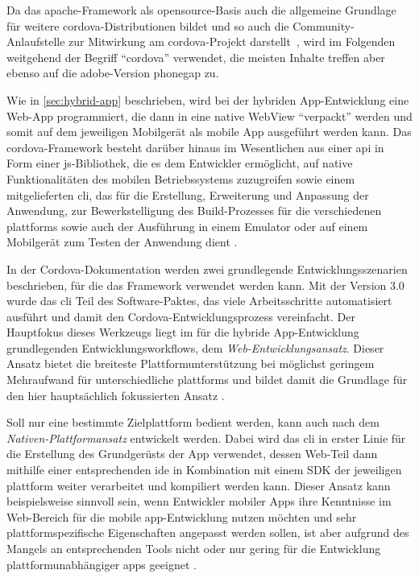 Da das \gls{apache}-Framework als \gls{opensource}-Basis auch die allgemeine Grundlage für weitere \gls{cordova}-Distributionen bildet und so auch die Community-Anlaufstelle zur Mitwirkung am \gls{cordova}-Projekt darstellt~\cite{PhoneGap_Cordova_and_whats_in_a_name}, wird im Folgenden weitgehend der Begriff \enquote{\gls{cordova}} verwendet, die meisten Inhalte treffen aber ebenso auf die \gls{adobe}-Version \gls{phonegap} zu. 


Wie in \autoref{sec:hybrid-app} beschrieben, wird bei der hybriden App-Entwicklung eine Web-App programmiert, die dann in eine native WebView \enquote{verpackt} werden und somit auf dem jeweiligen Mobilgerät als mobile App ausgeführt werden kann. 
Das \gls{cordova}-Framework besteht darüber hinaus im Wesentlichen aus einer \gls{api} in Form einer \gls{js}-Bibliothek, die es dem Entwickler ermöglicht, auf native Funktionalitäten des mobilen Betriebssystems zuzugreifen sowie einem mitgelieferten \gls{cli}, das für die Erstellung, Erweiterung und Anpassung der Anwendung, zur Bewerkstelligung des Build-Prozesses für die verschiedenen \glspl{plattform} sowie auch der Ausführung in einem Emulator oder auf einem Mobilgerät zum Testen der Anwendung dient \cite{Cordova-Docs_Overview}.


In der Cordova-Dokumentation werden zwei grundlegende Entwicklungsszenarien beschrieben, für die das Framework verwendet werden kann. 
Mit der Version 3.0 wurde das \gls{cli} Teil des Software-Paktes, das viele Arbeitsschritte automatisiert ausführt und damit den Cordova-Entwicklungsprozess vereinfacht. 
Der Hauptfokus dieses Werkzeugs liegt im für die hybride App-Entwicklung grundlegenden Entwicklungsworkflows, dem \emph{Web-Ent\-wick\-lungs\-an\-satz}. %
Dieser Ansatz bietet die breiteste Plattformunterstützung bei möglichst geringem Mehraufwand für unterschiedliche \glspl{plattform} und bildet damit die Grundlage für den hier hauptsächlich fokussierten Ansatz \cite{Cordova-Docs_CLI}.

Soll nur eine bestimmte Zielplattform bedient werden, kann auch nach dem \emph{Nativen-Plattformansatz} entwickelt werden.
Dabei wird das \gls{cli} in erster Linie für die Erstellung des Grundgerüsts der App verwendet, dessen Web-Teil dann mithilfe einer entsprechenden \gls{ide} in Kombination mit einem SDK der jeweiligen \gls{plattform} weiter verarbeitet und kompiliert werden kann. 
Dieser Ansatz kann beispielsweise sinnvoll sein, wenn Entwickler mobiler Apps ihre Kenntnisse im Web-Bereich für die mobile \gls{app}-Entwicklung nutzen möchten und sehr plattformspezifische Eigenschaften angepasst werden sollen, ist aber aufgrund des Mangels an entsprechenden Tools nicht oder nur gering für die Entwicklung plattformunabhängiger \glspl{app} geeignet \cite{Cordova-Docs_CLI}. 

